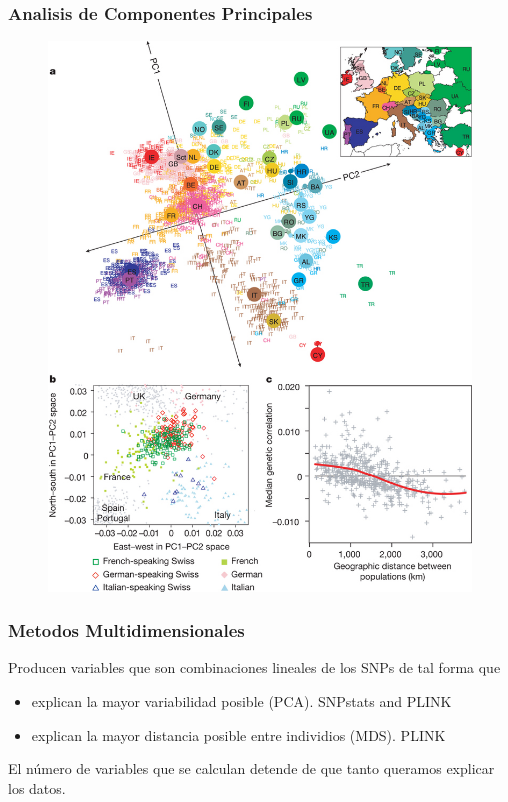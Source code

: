 \documentclass{beamer}\usepackage[]{graphicx}\usepackage[]{color}
\begin{document}
\begin{frame}[fragile]
\frametitle{Analisis de Componentes Principales}

\begin{figure}[htbp]
\begin{center}
\includegraphics[width=.5\linewidth]{eurpca.jpeg}
\end{center}
\end{figure}
\end{frame}

\begin{frame}[fragile]
\frametitle{Metodos Multidimensionales}

Producen variables que son combinaciones lineales de los SNPs de tal forma que
\begin{itemize}
\item explican la mayor variabilidad posible (PCA). SNPstats and PLINK
\item explican la mayor distancia posible entre individios (MDS). PLINK
\end{itemize}

El n\'umero de variables que se calculan detende de que tanto queramos explicar los datos.

\end{frame}
\end{document}
